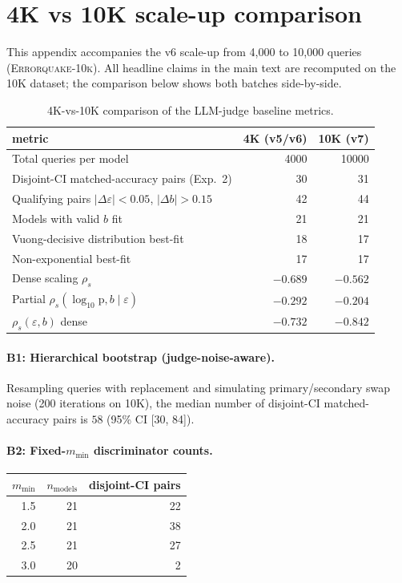 \documentclass{article}
\newcommand{\sdi}{\ensuremath{b}}
\begin{document}
\section{4K vs 10K scale-up comparison}\label{app:scaleup_comparison}

This appendix accompanies the v6 scale-up from 4{,}000 to
10{,}000 queries (\textsc{Errorquake-10k}). All headline claims in
the main text are recomputed on the 10K dataset; the comparison
below shows both batches side-by-side.

\begin{table}[h]
\centering
\small
\begin{tabular}{l r r}
\toprule
metric & 4K (v5/v6) & 10K (v7) \\
\midrule
Total queries per model & 4000 & 10000 \\
Disjoint-CI matched-accuracy pairs (Exp.~2) & 30 & 31 \\
Qualifying pairs $|\Delta\varepsilon|<0.05$, $|\Delta b|>0.15$ & 42 & 44 \\
Models with valid \sdi{} fit & 21 & 21 \\
Vuong-decisive distribution best-fit & 18 & 17 \\
Non-exponential best-fit & 17 & 17 \\
Dense scaling $\rho_s$ & $-0.689$ & $-0.562$ \\
Partial $\rho_s(\log_{10}\text{p}, b\mid\varepsilon)$ & $-0.292$ & $-0.204$ \\
$\rho_s(\varepsilon, b)$ dense & $-0.732$ & $-0.842$ \\
\bottomrule
\end{tabular}
\caption{4K-vs-10K comparison of the LLM-judge baseline metrics.}
\label{tab:scaleup_comparison}
\end{table}

\paragraph{B1: Hierarchical bootstrap (judge-noise-aware).}
Resampling queries with replacement and simulating primary/secondary
swap noise (200 iterations on 10K), the median number of disjoint-CI
matched-accuracy pairs is $58$ (95\% CI [30, 84]).

\paragraph{B2: Fixed-$m_{\min}$ discriminator counts.}
\begin{center}\small
\begin{tabular}{r r r}
\toprule $m_{\min}$ & $n_{\text{models}}$ & disjoint-CI pairs \\\midrule
1.5 & 21 & 22 \\
2.0 & 21 & 38 \\
2.5 & 21 & 27 \\
3.0 & 20 & 2 \\
\bottomrule\end{tabular}\end{center}
\end{document}
